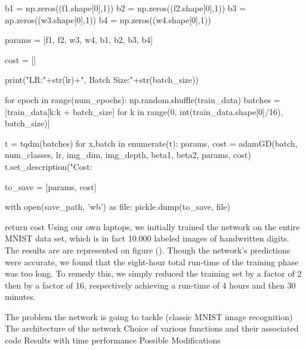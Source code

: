     b1 = np.zeros((f1.shape[0],1))
    b2 = np.zeros((f2.shape[0],1))
    b3 = np.zeros((w3.shape[0],1))
    b4 = np.zeros((w4.shape[0],1))

    params = [f1, f2, w3, w4, b1, b2, b3, b4]

    cost = []

    print("LR:"+str(lr)+", Batch Size:"+str(batch_size))

    for epoch in range(num_epochs):
        np.random.shuffle(train_data)
        batches = [train_data[k:k + batch_size] for k in range(0, int(train_data.shape[0]/16), batch_size)]

        t = tqdm(batches)
        for x,batch in enumerate(t):
            params, cost = adamGD(batch, num_classes, lr, img_dim, img_depth, beta1, beta2, params, cost)
            t.set_description("Cost: %
            
    to_save = [params, cost]
    
    with open(save_path, 'wb') as file:
        pickle.dump(to_save, file)
        
    return cost
\stoptyping
\startsection[title=Results]
Using our own laptops, we initially trained the network on the entire MNIST data set, which is in fact 10.000 labeled images of handwritten digits.
The results are are represented on figure ().
Though the network's predictions were accurate, we found that the eight-hour total run-time of the training phase  was too long.
To remedy this, we simply reduced the training set by a factor of 2 then by a factor of 16, respectively achieving a run-time of 4 hours and then 30 minutes. 





\stopsection

\startitemize
\startitem 
The problem the network is going to tackle (classic MNIST image recognition)
\stopitem
\startitem
The architecture of the network
\stopitem
\startitem
Choice of various functions and their associated code
\stopitem
\startitem
Results with time performance
\stopitem
\startitem
Possible Modifications
\stopitem
\stopitemize
\stopsection
